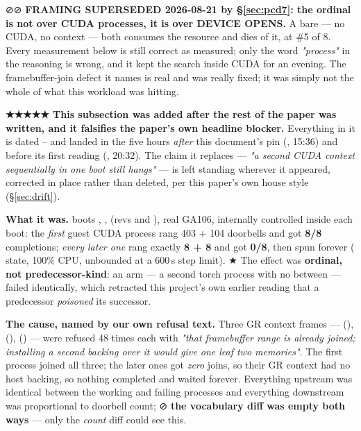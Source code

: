 \documentclass[10.5pt]{article}
\begin{document}
\begin{warnbox}\small
⊘⊘ \textbf{FRAMING SUPERSEDED 2026-08-21 by \S\ref{sec:pcd7}: the ordinal is not over CUDA
processes, it is over DEVICE OPENS.} A bare  --- no CUDA, no context --- both
consumes the resource and dies of it, at \#5 of 8. Every measurement below is still correct as
measured; only the word \emph{"process"} in the reasoning is wrong, and it kept the search inside
CUDA for an evening. The framebuffer-join defect it names is real and was really fixed; it was
simply not the whole of what this workload was hitting.

\smallskip
\textbf{★★★★★ This subsection was added after the rest of the paper was written, and it falsifies
the paper's own headline blocker.} Everything in it is dated -- and landed
in the five hours \emph{after} this document's pin (, 15:36) and before its first
reading (, 20:32). The claim it replaces --- \emph{"a second CUDA context
sequentially in one boot still hangs"} --- is left standing wherever it appeared, corrected in
place rather than deleted, per this paper's own house style (\S\ref{sec:drift}).
\end{warnbox}

\textbf{What it was.} \measured{} boots , ,  (revs
 and ), real GA106, internally controlled inside each boot: the
\emph{first} guest CUDA process rang 403  + 104  doorbells and got
\textbf{8/8} completions; \emph{every later one} rang exactly \textbf{8 + 8} and got
\textbf{0/8}, then spun forever ( state, 100\% CPU, unbounded at a 600\,s step limit).
★ The effect was \textbf{ordinal, not predecessor-kind}: an  arm --- a second torch
process with no  between --- failed identically, which retracted this project's
own earlier reading that a predecessor \emph{poisoned} its successor.

\textbf{The cause, named by our own refusal text.} Three GR context frames --- 
(),  (),
 () --- were refused 48 times each with \emph{"that
framebuffer range is already joined; installing a second backing over it would give one leaf two
memories"}. The first process joined all three; the later ones got \emph{zero} joins, so their GR
context had no host backing, so nothing completed and  waited forever. Everything
upstream was identical between the working and failing processes and everything downstream was
proportional to doorbell count; ⊘ \textbf{the vocabulary diff was empty both ways} --- only the
\emph{count} diff could see this.
\end{document}

